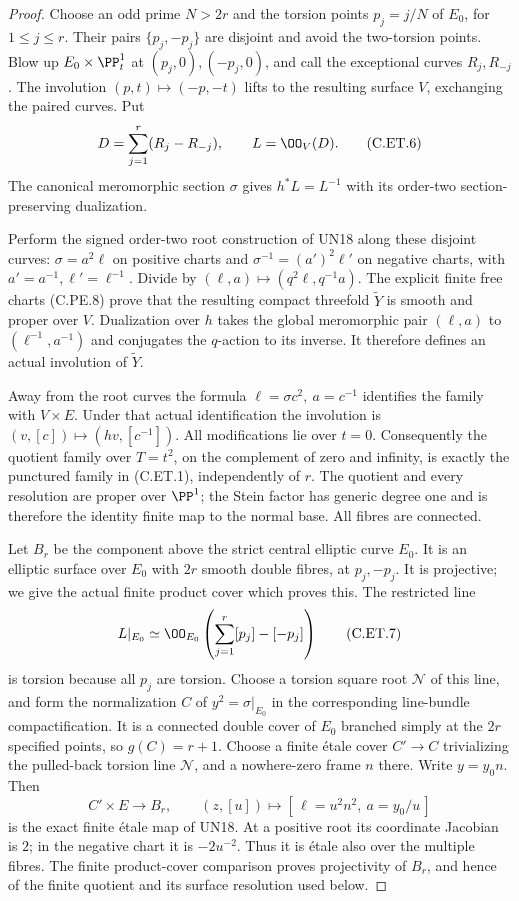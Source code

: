 \begin{proof}
Choose an odd prime $N>2r$ and the torsion
points $p_j=j/N$ of $E_0$, for $1\le j\le r$.
Their pairs $\{p_j,-p_j\}$ are disjoint and
avoid the two-torsion points. Blow up
$E_0\times\PP^1_t$ at $(p_j,0),(-p_j,0)$,
and call the exceptional curves $R_j,R_{-j}$.
The involution $(p,t)\mapsto(-p,-t)$ lifts
to the resulting surface $V$, exchanging
the paired curves. Put
\[
       D=\sum_{j=1}^r(R_j-R_{-j}),\qquad L=\OO_V(D).
                                                               \tag{C.ET.6}
\]
The canonical meromorphic section $\sigma$
gives $h^*L=L^{-1}$ with its order-two
section-preserving dualization.

Perform the signed order-two root construction
of UN18 along these disjoint curves:
$\sigma=a^2\ell$ on positive charts and
$\sigma^{-1}=(a')^2\ell'$ on negative charts,
with $a'=a^{-1},\ell'=\ell^{-1}$.
Divide by $(\ell,a)\mapsto(q^2\ell,q^{-1}a)$.
The explicit finite free charts (C.PE.8)
prove that the resulting compact threefold
$\widetilde Y$ is smooth and proper over $V$.
Dualization over $h$ takes the global
meromorphic pair $(\ell,a)$ to
$(\ell^{-1},a^{-1})$ and conjugates the
$q$-action to its inverse. It therefore
defines an actual involution of
$\widetilde Y$.

Away from the root curves the formula
$\ell=\sigma c^2,\ a=c^{-1}$ identifies the
family with $V\times E$. Under that actual
identification the involution is
$(v,[c])\mapsto(hv,[c^{-1}])$.
All modifications lie over $t=0$.
Consequently the quotient family over
$T=t^2$, on the complement of zero and
infinity, is exactly the punctured family
in (C.ET.1), independently of $r$.
The quotient and every resolution are proper over
$\PP^1$; the Stein factor has generic degree one
and is therefore the identity finite map to the
normal base. All fibres are connected.

Let $B_r$ be the component above the
strict central elliptic curve $E_0$.
It is an elliptic surface over $E_0$
with $2r$ smooth double fibres, at
$p_j,-p_j$. It is projective; we
give the actual finite product cover
which proves this. The restricted line
\[
 L|_{E_0}\simeq
       \OO_{E_0}\left(\sum_{j=1}^r[p_j]-[-p_j]\right)
                                                               \tag{C.ET.7}
\]
is torsion because all $p_j$ are torsion.
Choose a torsion square root $\mathcal N$
of this line, and form the normalization
$C$ of $y^2=\sigma|_{E_0}$ in the
corresponding line-bundle compactification.
It is a connected double cover of $E_0$
branched simply at the $2r$ specified
points, so $g(C)=r+1$.
Choose a finite \'etale cover $C'\to C$
trivializing the pulled-back torsion
line $\mathcal N$, and a nowhere-zero
frame $n$ there. Write $y=y_0n$.
Then
\[
 C'\times E\longrightarrow B_r,\qquad
 (z,[u])\longmapsto
             [\,\ell=u^2n^2,\ a=y_0/u\,]             \tag{C.ET.8}
\]
is the exact finite \'etale map of UN18.
At a positive root its coordinate Jacobian
is $2$; in the negative chart it is
$-2u^{-2}$. Thus it is \'etale also
over the multiple fibres. The finite
product-cover comparison proves
projectivity of $B_r$, and hence of
the finite quotient and its surface
resolution used below.


\end{proof}
